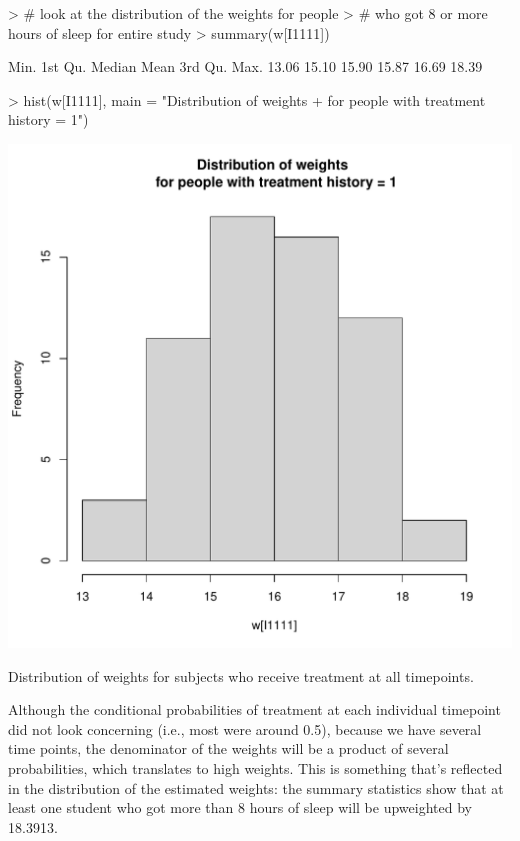 \documentclass[answers]{exam}
\newenvironment{myfigure}{\captionsetup{type=mytype}}{}
\begin{document}
\begin{enumerate}
\begin{solution}
\begin{Schunk}
\begin{Sinput}
> # look at the distribution of the weights for people 
> # who got 8 or more hours of sleep for entire study
> summary(w[I1111])
\end{Sinput}
\begin{Soutput}
   Min. 1st Qu.  Median    Mean 3rd Qu.    Max. 
  13.06   15.10   15.90   15.87   16.69   18.39 
\end{Soutput}
\begin{Sinput}
> hist(w[I1111], main = "Distribution of weights 
+      for people with treatment history = 1")
\end{Sinput}
\end{Schunk}
\begin{myfigure}
\begin{center}
\includegraphics[width=.4\textwidth]{w1111Hist2.pdf}
\caption{Distribution of weights for subjects who receive treatment at all timepoints.}
\label{Fig:w1111Hist2}
\end{center}
\end{myfigure}

Although the conditional probabilities of treatment at each individual timepoint did not look concerning (i.e., most were around 0.5), because we have several time points, the denominator of the weights will be a product of several probabilities, which translates to high weights. This is something that's reflected in the distribution of the estimated weights: the summary statistics show that at least one student who got more than 8 hours of sleep will be upweighted by 18.3913. 


\end{solution}
\end{enumerate}
\end{document}
